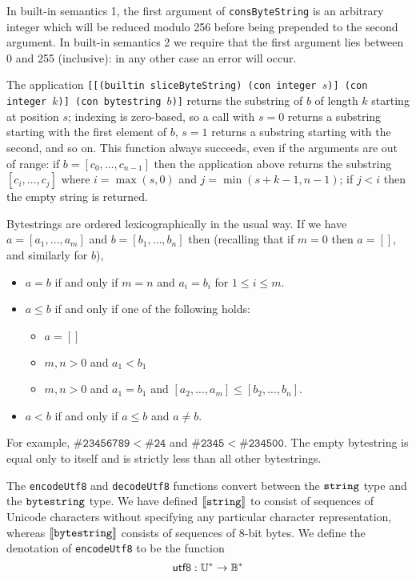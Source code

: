 \label{note:consbytestring}
In built-in semantics 1, the first argument of \texttt{consByteString} is an
arbitrary integer which will be reduced modulo 256 before being prepended to the
second argument.  In built-in semantics 2 we require that the first argument lies between 0
and 255 (inclusive): in any other case an error will occur.

\label{note:slicebytestring}
The application \texttt{[[(builtin sliceByteString) (con integer $s$)] (con
    integer $k$)] (con bytestring $b$)]} returns the substring of $b$ of length
$k$ starting at position $s$; indexing is zero-based, so a call with $s=0$
returns a substring starting with the first element of $b$, $s=1$ returns a
substring starting with the second, and so on.  This function always succeeds,
even if the arguments are out of range: if $b=[c_0, \ldots, c_{n-1}]$ then the
  application above returns the substring $[c_i, \ldots, c_j]$ where
  $i=\max(s,0)$ and $j=\min(s+k-1, n-1)$; if $j<i$ then the empty string is returned.

\label{note:bytestring-comparison}
Bytestrings are ordered lexicographically in the usual way. If we have $a =
  [a_1, \ldots, a_m]$ and $b = [b_1, \ldots, b_n]$ then (recalling that if $m=0$
  then $a=[]$, and similarly for $b$),
\begin{itemize}
\item $a = b$ if and only if $m=n$ and $a_i = b_i$ for $1 \leq i \leq m$.

\item $a \leq b$ if and only if one of the following holds:
\begin{itemize}
  \item $a = []$
  \item $m,n > 0$ and $a_1 < b_1$
  \item $m,n > 0$ and $a_1 = b_1$ and $[a_2,\ldots,a_m] \leq [b_2,\ldots,b_n]$.
\end{itemize}
\item $a < b$ if and only if $a \leq b$ and $a \neq b$.
\end{itemize}
\noindent For example, $\mathtt{\#23456789} < \mathtt{\#24}$ and
$\mathtt{\#2345} < \mathtt{\#234500}$.  The empty bytestring is equal only to
itself and is strictly less than all other bytestrings.

\label{note:bytestring-encoding}
The \texttt{encodeUtf8} and \texttt{decodeUtf8} functions convert between the
$\mathtt{string}$ type and the $\mathtt{bytestring}$ type.  We have defined
$\llbracket\mathit{\mathtt{string}}\rrbracket$ to consist of sequences of Unicode characters without
specifying any particular character representation, whereas
$\llbracket\mathit{\mathtt{bytestring}}\rrbracket$ consists of sequences of 8-bit bytes.  We define the
denotation of \texttt{encodeUtf8} to be the function
$$
\mathsf{utf8}: \mathbb{U}^* \rightarrow \mathbb{B}^*
$$


